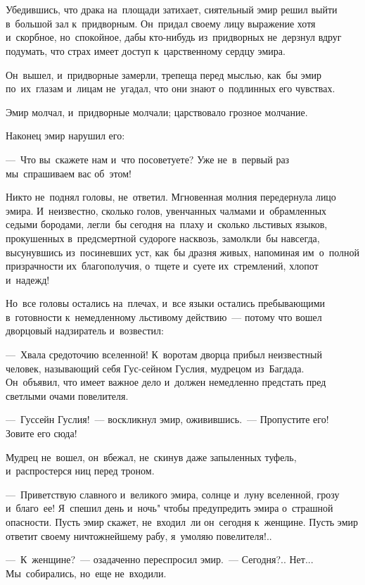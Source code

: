 \documentclass[12pt,a4paper]{book}
\begin{document}
\chapter{}

Убедившись, что драка на~площади затихает, сиятельный эмир решил выйти в~большой зал к~придворным. Он~придал своему лицу выражение хотя и~скорбное, но~спокойное, дабы кто-нибудь из~придворных не~дерзнул вдруг подумать, что страх имеет доступ к~царственному сердцу эмира.

Он~вышел, и~придворные замерли, трепеща перед мыслью, как~бы эмир по~их~глазам и~лицам не~угадал, что они знают о~подлинных его чувствах.

Эмир молчал, и~придворные молчали; царствовало грозное молчание.

Наконец эмир нарушил его:

—~Что вы~скажете нам и~что посоветуете? Уже не~в~первый раз мы~спрашиваем вас об~этом!

Никто не~поднял головы, не~ответил. Мгновенная молния передернула лицо эмира. И~неизвестно, сколько голов, увенчанных чалмами и~обрамленных седыми бородами, легли~бы сегодня на~плаху и~сколько льстивых языков, прокушенных в~предсмертной судороге насквозь, замолкли~бы навсегда, высунувшись из~посиневших уст, как~бы дразня живых, напоминая им~о~полной призрачности их~благополучия, о~тщете и~суете их~стремлений, хлопот и~надежд!

Но~все головы остались на~плечах, и~все языки остались пребывающими в~готовности к~немедленному льстивому действию~— потому что вошел дворцовый надзиратель и~возвестил:

—~Хвала средоточию вселенной! К~воротам дворца прибыл неизвестный человек, называющий себя Гус-сейном Гуслия, мудрецом из~Багдада. Он~объявил, что имеет важное дело и~должен немедленно предстать пред светлыми очами повелителя.

—~Гуссейн Гуслия!~— воскликнул эмир, оживившись.~— Пропустите его! Зовите его сюда!

Мудрец не~вошел, он~вбежал, не~скинув даже запыленных туфель, и~распростерся ниц перед троном.

—~Приветствую славного и~великого эмира, солнце и~луну вселенной, грозу и~благо~ее! Я~спешил день и~ночь" чтобы предупредить эмира о~страшной опасности. Пусть эмир скажет, не~входил~ли он~сегодня к~женщине. Пусть эмир ответит своему ничтожнейшему рабу, я~умоляю повелителя!..

—~К~женщине?~— озадаченно переспросил эмир.~— Сегодня?.. Нет... Мы~собирались, но~еще не~входили.
\end{document}

